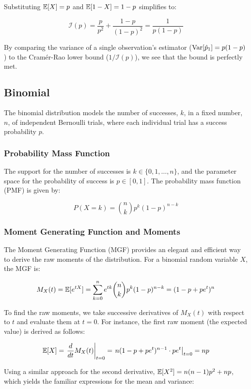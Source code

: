 Substituting $\mathbb{E}[X] = p$ and $\mathbb{E}[1-X] = 1-p$ simplifies to:

	\[
	\mathcal{I}(p) = \frac{p}{p^2} + \frac{1-p}{(1-p)^2} = \frac{1}{p(1-p)}
	\]
	
By comparing the variance of a single observation's estimator ($\operatorname{Var}[\hat{p}_1] = p(1-p)$) to the Cram\'{e}r-Rao lower bound ($1/\mathcal{I}(p)$), we see that the bound is perfectly met. 

\clearpage
\subsection{Binomial}

The binomial distribution models the number of successes, $k$, in a fixed number, $n$, of independent Bernoulli trials, where each individual trial has a success probability $p$.

\subsubsection{Probability Mass Function}
The support for the number of successes is $k \in \{0, 1, \dots, n\}$, and the parameter space for the probability of success is $p \in [0, 1]$. The probability mass function (PMF) is given by:

\begin{equation}
	P(X = k) = \binom{n}{k}p^k\left(1-p\right)^{n-k}
	\label{pmf:binom}
\end{equation}

\subsubsection{Moment Generating Function and Moments}
The Moment Generating Function (MGF) provides an elegant and efficient way to derive the raw moments of the distribution. For a binomial random variable $X$, the MGF is:

	\[
	M_X(t) = \mathbb{E}[e^{tX}] = \sum_{k=0}^n e^{tk} \binom{n}{k}p^k(1-p)^{n-k} = (1 - p + pe^t)^n
	\]
	
To find the raw moments, we take successive derivatives of $M_X(t)$ with respect to $t$ and evaluate them at $t = 0$. For instance, the first raw moment (the expected value) is derived as follows:

	\[
	\mathbb{E}[X] = \left. \frac{d}{dt} M_X(t) \right|_{t=0} = \left. n(1 - p + pe^t)^{n-1} \cdot pe^t \right|_{t=0} = np
	\]
	
Using a similar approach for the second derivative, $\mathbb{E}[X^2] = n(n-1)p^2 + np$, which yields the familiar expressions for the mean and variance:
	
